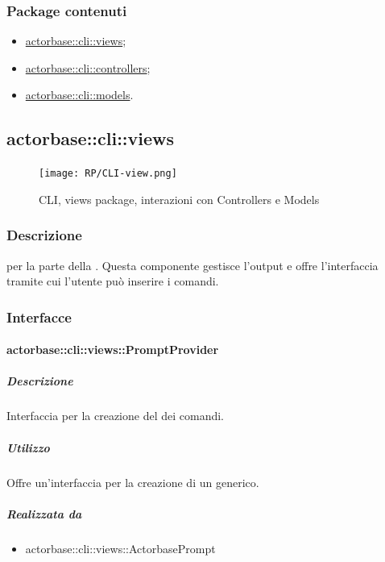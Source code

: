 \documentclass{scalatekids-article}
\begin{document}
\subsubsection{Package contenuti}
\begin{itemize}
\item \hyperref[sec:actorbase::cli::views]{actorbase::cli::views};
\item \hyperref[sec:actorbase::cli::controllers]{actorbase::cli::controllers};
\item \hyperref[sec:actorbase::cli::models]{actorbase::cli::models}.
\end{itemize}

\subsection{actorbase::cli::views}
\label{sec:actorbase::cli::views}

\begin{figure}[H]
  \begin{center}
    \texttt{[image: RP/CLI-view.png]}
    \caption{CLI, views package, interazioni con Controllers e Models}
  \end{center}
\end{figure}

\subsubsection{Descrizione}

 per la parte  della . Questa componente
gestisce l'output e offre l'interfaccia tramite cui l'utente può inserire i
comandi.

\subsubsection{Interfacce}

\paragraph{actorbase::cli::views::PromptProvider}
\label{sec:actorbase::cli::views::PromptProvider}

\subparagraph{Descrizione}
Interfaccia per la creazione del  dei comandi.

\subparagraph{Utilizzo}
Offre un'interfaccia per la creazione di un  generico.

\subparagraph{Realizzata da}
\begin{itemize}
\item actorbase::cli::views::ActorbasePrompt
\end{itemize}
\end{document}
